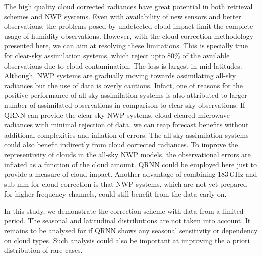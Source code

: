 \documentclass[amt, manuscript]{copernicus}
\begin{document}
The high quality cloud corrected radiances have great potential in both retrieval schemes and  NWP systems. Even with availability of new sensors and better observations, the problems posed by undetected cloud impact limit the complete usage of humidity observations. However, with the cloud correction methodology presented here, we can aim at resolving these limitations. This is specially true for clear-sky assimilation systems, which reject upto 80\% of the available observations due to cloud contamination. The loss is largest in mid-latitudes. Although, NWP systems are gradually moving towards assimilating all-sky radiances but the use of data is overly cautious. Infact, one of reasons for the positive performance of all-sky assimilation systems is also attributed to larger number of assimilated observations in comparison to clear-sky observations. If QRNN can provide the clear-sky NWP systems, cloud cleared microwave radiances with minimal rejection of data, we can reap forecast benefits without  additional complexities and inflation of errors. The all-sky assimilation systems could also benefit indirectly from cloud corrected radiances. To improve the representivity of clouds in the all-sky NWP models, the observational errors are inflated as a function of the cloud amount. QRNN could be employed here just to provide a measure of cloud impact. Another advantage of combining 183\,GHz and sub-mm for cloud correction is that NWP systems, which are not yet prepared for higher frequency channels, could still benefit from the data early on. 

In this study, we demonstrate the correction scheme with data from a limited period. The seasonal and latitudinal distributions are not taken into account. It remains to be  analysed for if QRNN shows any seasonal sensitivity or dependency on cloud types. Such analysis could also be important at improving the a priori distribution of rare cases. 






\end{document}
